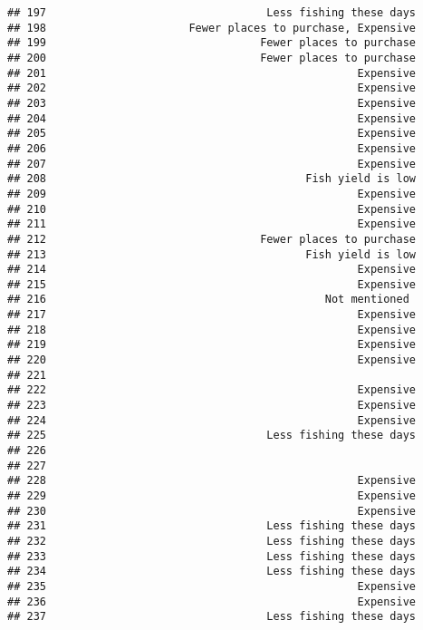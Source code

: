 \documentclass[
]{article}
\begin{document}
\begin{verbatim}
## 197                                  Less fishing these days
## 198                      Fewer places to purchase, Expensive
## 199                                 Fewer places to purchase
## 200                                 Fewer places to purchase
## 201                                                Expensive
## 202                                                Expensive
## 203                                                Expensive
## 204                                                Expensive
## 205                                                Expensive
## 206                                                Expensive
## 207                                                Expensive
## 208                                        Fish yield is low
## 209                                                Expensive
## 210                                                Expensive
## 211                                                Expensive
## 212                                 Fewer places to purchase
## 213                                        Fish yield is low
## 214                                                Expensive
## 215                                                Expensive
## 216                                           Not mentioned 
## 217                                                Expensive
## 218                                                Expensive
## 219                                                Expensive
## 220                                                Expensive
## 221                                                         
## 222                                                Expensive
## 223                                                Expensive
## 224                                                Expensive
## 225                                  Less fishing these days
## 226                                                         
## 227                                                         
## 228                                                Expensive
## 229                                                Expensive
## 230                                                Expensive
## 231                                  Less fishing these days
## 232                                  Less fishing these days
## 233                                  Less fishing these days
## 234                                  Less fishing these days
## 235                                                Expensive
## 236                                                Expensive
## 237                                  Less fishing these days

\end{verbatim}
\end{document}
